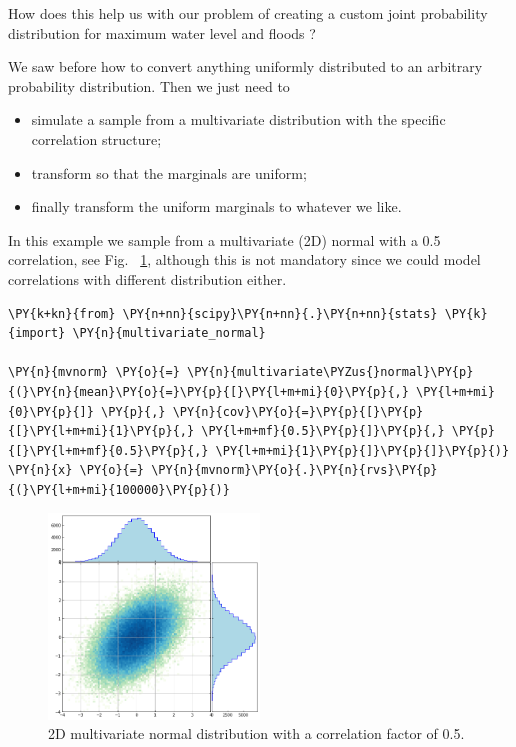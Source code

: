 How does this help us with our problem of creating a custom joint
probability distribution for maximum water level and floods ?

We saw before how to convert
anything uniformly distributed to an arbitrary probability distribution.
Then we just need to
\begin{itemize}
\tightlist
\item
  simulate a sample from a multivariate distribution with the specific correlation structure;
\item
  transform so that the marginals are uniform;
\item
  finally transform the uniform marginals to whatever we like.
\end{itemize}

In this example we sample from a multivariate (2D) normal with a 0.5 correlation, 
see Fig.~ \ref{fig:multivariate_with_correlation}, although this is not mandatory since
we could model correlations with different distribution either.

\begin{tcolorbox}[breakable, size=fbox, boxrule=1pt, pad at break*=1mm,colback=cellbackground, colframe=cellborder]
\begin{Verbatim}[commandchars=\\\{\}]
\PY{k+kn}{from} \PY{n+nn}{scipy}\PY{n+nn}{.}\PY{n+nn}{stats} \PY{k}{import} \PY{n}{multivariate_normal}

\PY{n}{mvnorm} \PY{o}{=} \PY{n}{multivariate\PYZus{}normal}\PY{p}{(}\PY{n}{mean}\PY{o}{=}\PY{p}{[}\PY{l+m+mi}{0}\PY{p}{,} \PY{l+m+mi}{0}\PY{p}{]} \PY{p}{,} \PY{n}{cov}\PY{o}{=}\PY{p}{[}\PY{p}{[}\PY{l+m+mi}{1}\PY{p}{,} \PY{l+m+mf}{0.5}\PY{p}{]}\PY{p}{,} \PY{p}{[}\PY{l+m+mf}{0.5}\PY{p}{,} \PY{l+m+mi}{1}\PY{p}{]}\PY{p}{]}\PY{p}{)}
\PY{n}{x} \PY{o}{=} \PY{n}{mvnorm}\PY{o}{.}\PY{n}{rvs}\PY{p}{(}\PY{l+m+mi}{100000}\PY{p}{)}
\end{Verbatim}
\end{tcolorbox}

\begin{figure}[hb]
  \centering
  \includegraphics[width=0.5\textwidth]{figures/lesson6_14_0.png}
  \caption{2D multivariate normal distribution with a correlation factor of 0.5.}
  \label{fig:multivariate_with_correlation}
\end{figure}
    
